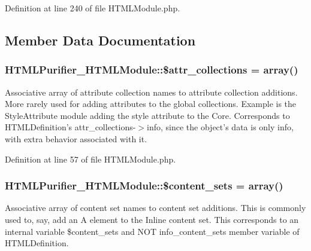 Definition at line 240 of file H\+T\+M\+L\+Module.\+php.



\subsection{Member Data Documentation}
\hypertarget{classHTMLPurifier__HTMLModule_a7c8805952fcf0ad143180d97b3d3ec17}{
\subsubsection[{\$attr\+\_\+collections}]{\setlength{\rightskip}{0pt plus 5cm}H\+T\+M\+L\+Purifier\+\_\+\+H\+T\+M\+L\+Module\+::\$attr\+\_\+collections = array()}}\label{classHTMLPurifier__HTMLModule_a7c8805952fcf0ad143180d97b3d3ec17}
Associative array of attribute collection names to attribute collection additions. More rarely used for adding attributes to the global collections. Example is the Style\+Attribute module adding the style attribute to the Core. Corresponds to H\+T\+M\+L\+Definition's attr\+\_\+collections-\/$>$info, since the object's data is only info, with extra behavior associated with it. 

Definition at line 57 of file H\+T\+M\+L\+Module.\+php.

\hypertarget{classHTMLPurifier__HTMLModule_a9ab9ca2173f38bb33d398db756714809}{
\subsubsection[{\$content\+\_\+sets}]{\setlength{\rightskip}{0pt plus 5cm}H\+T\+M\+L\+Purifier\+\_\+\+H\+T\+M\+L\+Module\+::\$content\+\_\+sets = array()}}\label{classHTMLPurifier__HTMLModule_a9ab9ca2173f38bb33d398db756714809}
Associative array of content set names to content set additions. This is commonly used to, say, add an A element to the Inline content set. This corresponds to an internal variable \$content\+\_\+sets and N\+O\+T info\+\_\+content\+\_\+sets member variable of H\+T\+M\+L\+Definition. 

